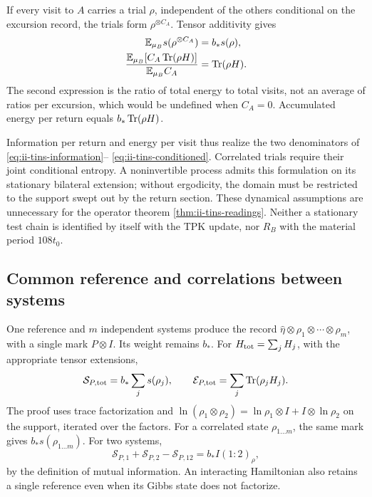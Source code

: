 If every visit to $A$ carries a trial $\rho$, independent of the others
conditional on the excursion record, the trials form
$\rho^{\otimes C_A}$. Tensor additivity gives
\begin{align}
 \mathbb E_{\mu_B}s(\rho^{\otimes C_A})&=b_*s(\rho),\nonumber\\
 \frac{\mathbb E_{\mu_B}[C_A\operatorname{Tr}(\rho H)]}
      {\mathbb E_{\mu_B}C_A}&=\operatorname{Tr}(\rho H).
 \label{eq:ii-tins-visit-readings}
\end{align}
The second expression is the ratio of total energy to total visits,
not an average of ratios per excursion, which would be undefined when
$C_A=0$. Accumulated energy per return equals $b_*\operatorname{Tr}(\rho H)$.

Information per return and energy per visit thus realize the two
denominators of \eqref{eq:ii-tins-information}--
\eqref{eq:ii-tins-conditioned}. Correlated trials require their joint
conditional entropy. A noninvertible process admits this formulation
on its stationary bilateral extension; without ergodicity, the domain
must be restricted to the support swept out by the return section.
These dynamical assumptions are unnecessary for the operator theorem
\ref{thm:ii-tins-readings}. Neither a stationary test chain is identified
by itself with the TPK update, nor $R_B$ with the material period $108t_0$.

\subsection{Common reference and correlations between systems}
\label{subsec:ii-tins-comun}

One reference and $m$ independent systems produce the record
$\widehat\eta\otimes\rho_1\otimes\cdots\otimes\rho_m$, with a
single mark $P\otimes I$. Its weight remains $b_*$. For
$H_{\rm tot}=\sum_jH_j$, with the appropriate tensor extensions,
\begin{equation}
 \mathcal S_{P,\rm tot}=b_*\sum_js(\rho_j),\qquad
 \mathcal E_{P,\rm tot}=\sum_j\operatorname{Tr}(\rho_jH_j).
 \label{eq:ii-tins-common}
\end{equation}
The proof uses trace factorization and
$\ln(\rho_1\otimes\rho_2)=\ln\rho_1\otimes I+I\otimes\ln\rho_2$
on the support, iterated over the factors. For a correlated state
$\rho_{1\ldots m}$, the same mark gives $b_*s(\rho_{1\ldots m})$.
For two systems,
\begin{equation}
 \mathcal S_{P,1}+\mathcal S_{P,2}-\mathcal S_{P,12}
 =b_*I(1:2)_\rho,
 \label{eq:ii-tins-mutual}
\end{equation}
by the definition of mutual information. An interacting Hamiltonian also
retains a single reference even when its Gibbs state does not factorize.

